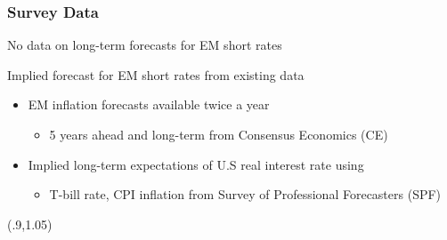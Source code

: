 \documentclass[12pt, aspectratio=169, xcolor=dvipsnames]{beamer}
\begin{document}



\begin{frame}[label=SCBP]
\frametitle{Survey Data}

No data on long-term forecasts for EM short rates

Implied forecast for EM short rates from existing data %



\begin{itemize}
\item \alert{EM inflation} forecasts available twice a year
\begin{itemize}
	\item 5 years ahead and long-term from Consensus Economics (CE)
\end{itemize}

\item Implied long-term expectations of \alert{U.S real interest rate} using
\begin{itemize}
\item T-bill rate, CPI inflation from Survey of Professional Forecasters (SPF)
\end{itemize}
\end{itemize}

\begin{textblock*}{3cm}(.9\textwidth,1.05\textheight)
	\hyperlink{YldCBP}{}
\end{textblock*}
\end{frame}
\end{document}
